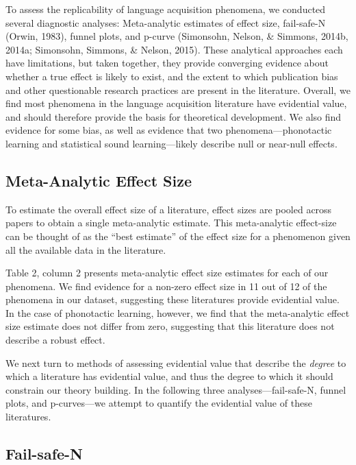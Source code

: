 \documentclass[english,floatsintext,man]{apa6}
\begin{document}
To assess the replicability of language acquisition phenomena, we
conducted several diagnostic analyses: Meta-analytic estimates of effect
size, fail-safe-N (Orwin, 1983), funnel plots, and p-curve (Simonsohn,
Nelson, \& Simmons, 2014b, 2014a; Simonsohn, Simmons, \& Nelson, 2015).
These analytical approaches each have limitations, but taken together,
they provide converging evidence about whether a true effect is likely
to exist, and the extent to which publication bias and other
questionable research practices are present in the literature. Overall,
we find most phenomena in the language acquisition literature have
evidential value, and should therefore provide the basis for theoretical
development. We also find evidence for some bias, as well as evidence
that two phenomena---phonotactic learning and statistical sound
learning---likely describe null or near-null effects.

\subsection{Meta-Analytic Effect Size}\label{meta-analytic-effect-size}

To estimate the overall effect size of a literature, effect sizes are
pooled across papers to obtain a single meta-analytic estimate. This
meta-analytic effect-size can be thought of as the \enquote{best
estimate} of the effect size for a phenomenon given all the available
data in the literature.

Table 2, column 2 presents meta-analytic effect size estimates for each
of our phenomena. We find evidence for a non-zero effect size in 11 out
of 12 of the phenomena in our dataset, suggesting these literatures
provide evidential value. In the case of phonotactic learning, however,
we find that the meta-analytic effect size estimate does not differ from
zero, suggesting that this literature does not describe a robust effect.

We next turn to methods of assessing evidential value that describe the
\emph{degree} to which a literature has evidential value, and thus the
degree to which it should constrain our theory building. In the
following three analyses---fail-safe-N, funnel plots, and p-curves---we
attempt to quantify the evidential value of these literatures.

\subsection{Fail-safe-N}\label{fail-safe-n}
\end{document}
